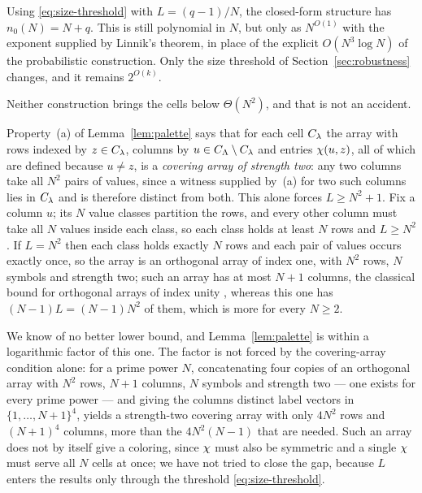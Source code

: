 Using \eqref{eq:size-threshold} with $L=(q-1)/N$, the closed-form structure
has $n_0(N)=N+q$. This is still polynomial in $N$, but only as $N^{O(1)}$
with the exponent supplied by Linnik's theorem, in place of the explicit
$O(N^3\log N)$ of the probabilistic construction. Only the size threshold of
Section~\ref{sec:robustness} changes, and it remains $2^{O(k)}$.

Neither construction brings the cells below $\Theta(N^2)$, and that is not an
accident.
\begin{remark}\label{rem:covering}
Property~(a) of Lemma~\ref{lem:palette} says that for each cell
$C_{\lambda}$ the array with rows indexed by $z\in C_{\lambda}$, columns by
$u\in C_{\Lambda}\setminus C_{\lambda}$ and entries $\chi(u,z)$, all of which
are defined because $u\ne z$, is a \emph{covering array of strength two}:
any two columns take all $N^2$ pairs of values, since a witness supplied
by~(a) for two such columns lies in $C_{\lambda}$ and is therefore distinct
from both. This alone forces $L\ge N^2+1$. Fix a column $u$; its $N$ value classes partition the
rows, and every other column must take all $N$ values inside each class, so
each class holds at least $N$ rows and $L\ge N^2$. If $L=N^2$ then each
class holds exactly $N$ rows and each pair of values occurs exactly once, so
the array is an orthogonal array of index one, with $N^2$ rows, $N$ symbols
and strength two; such an array has at most $N+1$ columns, the classical
bound for orthogonal arrays of index unity
\citep{bush1952,hedayat-sloane-stufken1999}, whereas this one has
$(N-1)L=(N-1)N^2$ of them, which is more for every $N\ge2$.

We know of no better lower bound, and Lemma~\ref{lem:palette} is within
a logarithmic factor of this one. The factor is not forced by the
covering-array condition alone: for a prime power $N$, concatenating four
copies of an orthogonal array with $N^2$ rows, $N+1$ columns, $N$ symbols
and strength two --- one exists for every prime power
\citep{hedayat-sloane-stufken1999} --- and giving the columns
distinct label vectors in
$\{1,\ldots,N+1\}^4$, yields a strength-two covering array with only $4N^2$
rows and $(N+1)^4$ columns, more than the $4N^2(N-1)$ that are needed. Such
an array does not by itself give a
coloring, since $\chi$ must also be symmetric and a single $\chi$ must
serve all $N$ cells at once; we have not tried to close the gap, because $L$
enters the results only through the threshold \eqref{eq:size-threshold}.
\end{remark}

